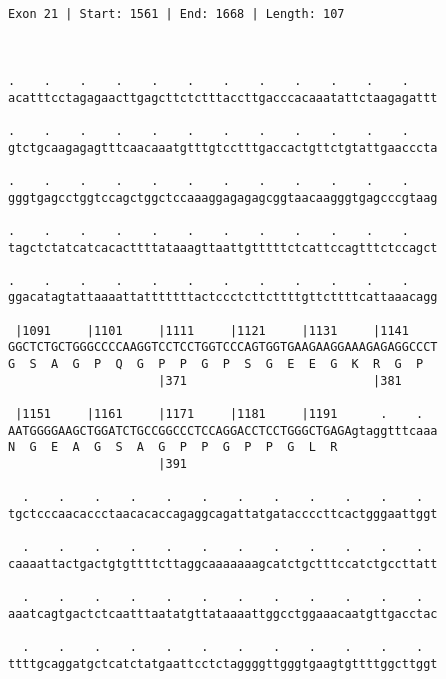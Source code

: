\documentclass{article}
\begin{document}
\begin{Verbatim}
                                                      
 
Exon 21 | Start: 1561 | End: 1668 | Length: 107



.    .    .    .    .    .    .    .    .    .    .    .    
acatttcctagagaacttgagcttctctttaccttgacccacaaatattctaagagattt
                                                            
.    .    .    .    .    .    .    .    .    .    .    .    
gtctgcaagagagtttcaacaaatgtttgtcctttgaccactgttctgtattgaacccta
                                                            
.    .    .    .    .    .    .    .    .    .    .    .    
gggtgagcctggtccagctggctccaaaggagagagcggtaacaagggtgagcccgtaag
                                                            
.    .    .    .    .    .    .    .    .    .    .    .    
tagctctatcatcacacttttataaagttaattgtttttctcattccagtttctccagct
                                                            
.    .    .    .    .    .    .    .    .    .    .    .    
ggacatagtattaaaattatttttttactccctcttcttttgttcttttcattaaacagg
                                                            
 |1091     |1101     |1111     |1121     |1131     |1141    
GGCTCTGCTGGGCCCCAAGGTCCTCCTGGTCCCAGTGGTGAAGAAGGAAAGAGAGGCCCT
G  S  A  G  P  Q  G  P  P  G  P  S  G  E  E  G  K  R  G  P  
                     |371                          |381     
  
 |1151     |1161     |1171     |1181     |1191      .    .  
AATGGGGAAGCTGGATCTGCCGGCCCTCCAGGACCTCCTGGGCTGAGAgtaggtttcaaa
N  G  E  A  G  S  A  G  P  P  G  P  P  G  L  R              
                     |391                                   
  
  .    .    .    .    .    .    .    .    .    .    .    .  
tgctcccaacaccctaacacaccagaggcagattatgataccccttcactgggaattggt
                                                            
  .    .    .    .    .    .    .    .    .    .    .    .  
caaaattactgactgtgttttcttaggcaaaaaaagcatctgctttccatctgccttatt
                                                            
  .    .    .    .    .    .    .    .    .    .    .    .  
aaatcagtgactctcaatttaatatgttataaaattggcctggaaacaatgttgacctac
                                                            
  .    .    .    .    .    .    .    .    .    .    .    .  
ttttgcaggatgctcatctatgaattcctctaggggttgggtgaagtgttttggcttggt
                                                            

\end{Verbatim}
\end{document}
